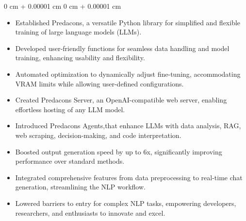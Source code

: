 \documentclass[10pt, letterpaper]{article}
\newenvironment{highlights}{
    \begin{itemize}[
        topsep=0.03 cm,
        parsep=0.02 cm,
        partopsep=0pt,
        itemsep=0pt,
        leftmargin=0 cm + 5pt
    ]
}{
    \end{itemize}
} %
\newenvironment{onecolentry}{
    \begin{adjustwidth}{
        0 cm + 0.00001 cm
    }{
        0 cm + 0.00001 cm
    }
}{
    \end{adjustwidth}
} %
\begin{document}
    \vspace{0.10 cm}
    \begin{onecolentry}
        \begin{highlights}
            \item Established Predacons, a versatile Python library for simplified and flexible training of large language models (LLMs).
            \item Developed user-friendly functions for seamless data handling and model training, enhancing usability and flexibility.
            \item Automated optimization to dynamically adjust fine-tuning, accommodating VRAM limits while allowing user-defined configurations.
            \item Created Predacons Server, an OpenAI-compatible web server, enabling effortless hosting of any LLM model.
            \item Introduced Predacons Agents,that enhance LLMs with data analysis, RAG, web scraping, decision-making, and code interpretation.
            \item Boosted output generation speed by up to 6x, significantly improving performance over standard methods.
            \item Integrated comprehensive features from data preprocessing to real-time chat generation, streamlining the NLP workflow.
            \item Lowered barriers to entry for complex NLP tasks, empowering developers, researchers, and enthusiasts to innovate and excel.
        \end{highlights}
    \end{onecolentry}
    \vspace{0.10 cm}
    
    
\end{document}
